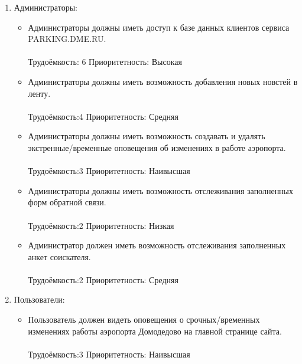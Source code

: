 \begin{enumerate}
      \item Администраторы:
      \begin{itemize}
            \item Администраторы должны иметь доступ к базе
                  данных клиентов сервиса PARKING.DME.RU.
                  \\\\
                  Трудоёмкость: 6   Приоритетность: Высокая
                  \\
            \item Администраторы должны иметь возможность
                  добавления новых новстей в ленту.
                  \\\\
                  Трудоёмкость:4    Приоритетность: Средняя
                  \\
            \item Администраторы должны иметь возможность
                  создавать и удалять экстренные/временные
                  оповещения об изменениях в работе аэропорта.
                  \\\\
                  Трудоёмкость:3    Приоритетность: Наивысшая
                  \\
            \item Администраторы должны иметь возможность
                  отслеживания заполненных форм обратной связи.
                  \\\\
                  Трудоёмкость:2    Приоритетность: Низкая
                  \\
            \item Администратор должен иметь возможность
                  отслеживания заполненных анкет соискателя.
                  \\\\
                  Трудоёмкость:2    Приоритетность: Средняя
      \end{itemize}
      \item Пользователи:
      \begin{itemize}
            \item Пользователь должен видеть оповещения о
            срочных/временных изменениях работы аэропорта
            Домодедово на главной странице сайта.
                  \\\\
                  Трудоёмкость:3    Приоритетность: Наивысшая
                  \\

\end{itemize}
\end{enumerate}
